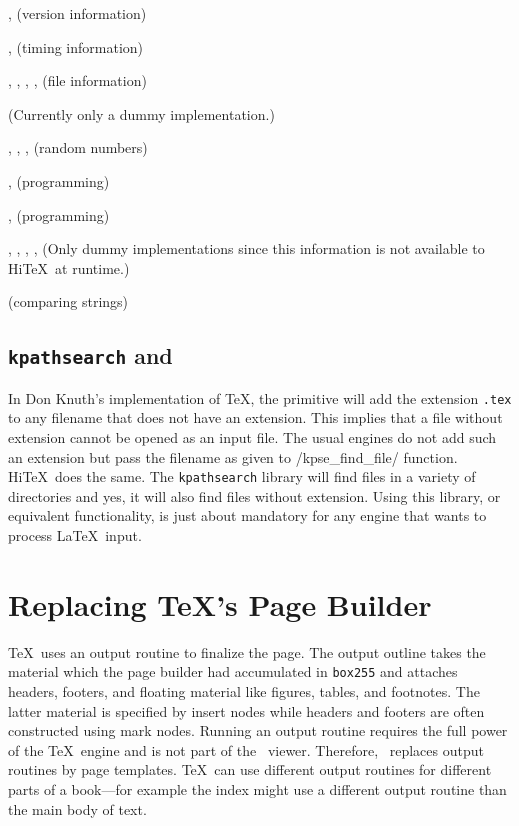 \itemize
\item{},  (version information)
\item{},  (timing information)
\item{}, , ,
     ,  (file information)
\item{} (Currently only a dummy implementation.)
\item{}, ,
     ,  (random numbers)
\item{},  (programming)
\item{},   (programming)
\item{}, , , ,
      (Only dummy implementations since this information
      is not available to Hi\TeX\ at runtime.)
\item{} (comparing strings)
\enditemize 


\subsection{{\tt kpathsearch} and }
In Don Knuth's implementation of \TeX, the  primitive
will add the extension {\tt .tex} to any filename that does not have an
extension. This implies that a file without extension cannot be opened
as an input file. The usual engines do not add such an extension but
pass the filename as given to \verbatim/kpse_find_file/ function. 
Hi\TeX\ does the same. The {\tt kpathsearch} library will find files
in a variety of directories and yes, it will also find files without
extension. Using this library, or equivalent functionality, is just about
mandatory for any engine that wants to process \LaTeX\ input.


\section{Replacing \TeX's Page Builder}\label{build}

\TeX\ uses an output routine to finalize the page. 
The output outline takes the material which the page builder had accumulated in {\tt box255}
and attaches headers, footers, and floating material
like figures, tables, and footnotes. The latter material is specified by insert nodes
while headers and footers are often constructed using mark nodes.
Running an output routine requires the full power of the \TeX\ engine and is not 
part of the \HINT\ viewer. Therefore, \HINT\ replaces output routines by page templates.
\TeX\ can use different output routines for different parts of a book---for example
the index might use a different output routine than the main body of text.

